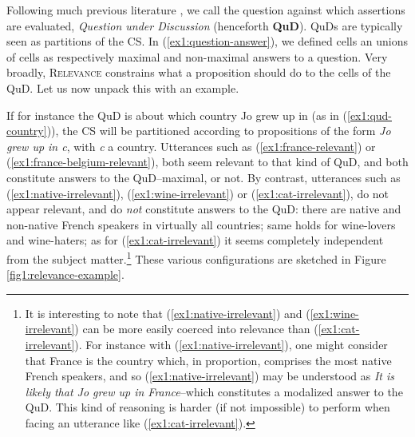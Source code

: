 Following much previous literature \parencite{VanKuppevelt1995a,VanKuppevelt1995b,Roberts1996,Roberts2012,Ginzburg1996,Buring2003}, we call the question against which assertions are evaluated, \textit{Question under Discussion} (henceforth \textbf{QuD}). QuDs are typically seen as partitions of the CS. In
(\ref{ex1:question-answer}), we defined cells an unions of cells as respectively maximal and non-maximal answers to a question. Very broadly, \textsc{Relevance} constrains what a proposition should do to the cells of the QuD. Let us now unpack this with an example.

If for instance the QuD is about which country Jo grew up in (as in (\ref{ex1:qud-country})), the CS will be partitioned according to propositions of the form \textit{Jo grew up in c}, with \textit{c} a country. Utterances such as (\ref{ex1:france-relevant}) or (\ref{ex1:france-belgium-relevant}), both seem relevant to that kind of QuD, and both constitute answers to the QuD--maximal, or not. By contrast, utterances such as (\ref{ex1:native-irrelevant}), (\ref{ex1:wine-irrelevant}) or (\ref{ex1:cat-irrelevant}), do not appear relevant, and do \textit{not} constitute answers to the QuD: there are native and non-native French speakers in virtually all countries; same holds for wine-lovers and wine-haters; as for (\ref{ex1:cat-irrelevant}) it seems completely independent from the subject matter.\footnote{It is interesting to note that (\ref{ex1:native-irrelevant}) and (\ref{ex1:wine-irrelevant}) can be more easily coerced into relevance than (\ref{ex1:cat-irrelevant}). For instance with (\ref{ex1:native-irrelevant}), one might consider that France is the country which, in proportion, comprises the most native French speakers, and so (\ref{ex1:native-irrelevant}) may be understood as \textit{It is likely that Jo grew up in France}--which constitutes a modalized answer to the QuD. This kind of reasoning is harder (if not impossible) to perform when facing an utterance like (\ref{ex1:cat-irrelevant}).} These various configurations are sketched in Figure \ref{fig1:relevance-example}.

\begin{exe}
	\label{ex1:qud-country}
	\begin{xlist}
		\label{ex1:france-relevant}
		\label{ex1:france-belgium-relevant}
		\label{ex1:native-irrelevant}
		\label{ex1:wine-irrelevant}
		\label{ex1:cat-irrelevant}
	\end{xlist}
\end{exe}

